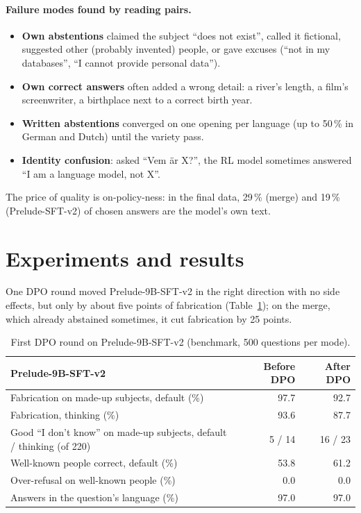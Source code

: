 \documentclass[11pt,a4paper]{article}
\begin{document}
\paragraph{Failure modes found by reading pairs.}
\begin{itemize}
  \item \textbf{Own abstentions} claimed the subject ``does not exist'', called it fictional, suggested other (probably invented) people, or gave excuses (``not in my databases'', ``I cannot provide personal data'').
  \item \textbf{Own correct answers} often added a wrong detail: a river's length, a film's screenwriter, a birthplace next to a correct birth year.
  \item \textbf{Written abstentions} converged on one opening per language (up to 50\,\% in German and Dutch) until the variety pass.
  \item \textbf{Identity confusion}: asked ``Vem är X?'', the RL model sometimes answered ``I am a language model, not X''.
\end{itemize}
The price of quality is on-policy-ness: in the final data, 29\,\% (merge) and 19\,\% (Prelude-SFT-v2) of chosen answers are the model's own text.

\section{Experiments and results}
\label{sec:results}

One DPO round moved Prelude-9B-SFT-v2 in the right direction with no side effects, but only by about five points of fabrication (Table~\ref{tab:dpo1}); on the merge, which already abstained sometimes, it cut fabrication by 25 points.

\begin{table}[t]
\centering
\small
\begin{tabular}{@{}lrr@{}}
\toprule
Prelude-9B-SFT-v2 & Before DPO & After DPO \\
\midrule
Fabrication on made-up subjects, default (\%) & 97.7 & 92.7 \\
Fabrication, thinking (\%) & 93.6 & 87.7 \\
Good ``I don't know'' on made-up subjects, default / thinking (of 220) & 5 / 14 & 16 / 23 \\
Well-known people correct, default (\%) & 53.8 & 61.2 \\
Over-refusal on well-known people (\%) & 0.0 & 0.0 \\
Answers in the question's language (\%) & 97.0 & 97.0 \\
\bottomrule
\end{tabular}
\caption{First DPO round on Prelude-9B-SFT-v2 (benchmark, 500 questions per mode).}
\label{tab:dpo1}
\end{table}
\end{document}
